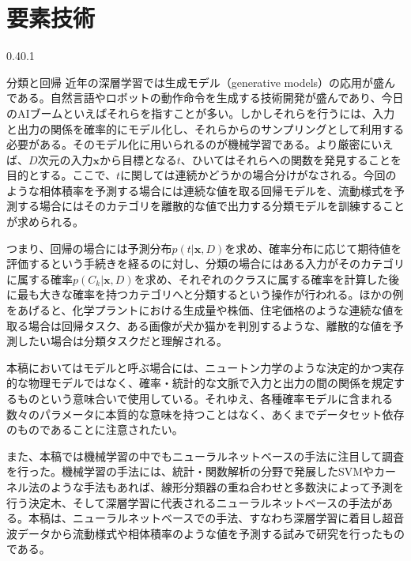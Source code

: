 \documentclass[uplatex]{suribt}
\makeatletter
\renewcommand{\subsection}{%
    \@startsection{subsection}{1}{\z@}%
    {0.4\Cvs}{0.1\Cvs}%
    {\normalfont\normalsize\headfont\raggedright}}
\makeatother
\begin{document}
\section{要素技術}
\subsection{分類と回帰}
近年の深層学習では生成モデル（generative models）の応用が盛んである。自然言語やロボットの動作命令を生成する技術開発が盛んであり、今日のAIブームといえばそれらを指すことが多い。しかしそれらを行うには、入力と出力の関係を確率的にモデル化し、それらからのサンプリングとして利用する必要がある。そのモデル化に用いられるのが機械学習である。より厳密にいえば、$D$次元の入力$\mathbf{x}$から目標となる$t$、ひいてはそれらへの関数を発見することを目的とする。ここで、$t$に関しては連続かどうかの場合分けがなされる。今回のような相体積率を予測する場合には連続な値を取る回帰モデルを、流動様式を予測する場合にはそのカテゴリを離散的な値で出力する分類モデルを訓練することが求められる。\par
つまり、回帰の場合には予測分布$p(t | \mathbf{x},D)$を求め、確率分布に応じて期待値を評価するという手続きを経るのに対し、分類の場合にはある入力がそのカテゴリに属する確率$p(C_k | \mathbf{x},D)$を求め、それぞれのクラスに属する確率を計算した後に最も大きな確率を持つカテゴリへと分類するという操作が行われる。ほかの例をあげると、化学プラントにおける生成量や株価、住宅価格のような連続な値を取る場合は回帰タスク、ある画像が犬か猫かを判別するような、離散的な値を予測したい場合は分類タスクだと理解される。\par
本稿においてはモデルと呼ぶ場合には、ニュートン力学のような決定的かつ実存的な物理モデルではなく、確率・統計的な文脈で入力と出力の間の関係を規定するものという意味合いで使用している。それゆえ、各種確率モデルに含まれる数々のパラメータに本質的な意味を持つことはなく、あくまでデータセット依存のものであることに注意されたい。\par
また、本稿では機械学習の中でもニューラルネットベースの手法に注目して調査を行った。機械学習の手法には、統計・関数解析の分野で発展したSVMやカーネル法のような手法もあれば、線形分類器の重ね合わせと多数決によって予測を行う決定木、そして深層学習に代表されるニューラルネットベースの手法がある。本稿は、ニューラルネットベースでの手法、すなわち深層学習に着目し超音波データから流動様式や相体積率のような値を予測する試みで研究を行ったものである。
\end{document}
